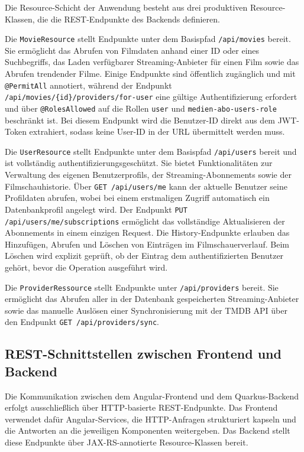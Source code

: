 Die Resource-Schicht der Anwendung besteht aus drei produktiven
Resource-Klassen, die die REST-Endpunkte des Backends definieren.

Die \texttt{MovieResource} stellt Endpunkte unter dem Basispfad
\texttt{/api/movies} bereit. Sie ermöglicht das Abrufen von Filmdaten anhand
einer ID oder eines Suchbegriffs, das Laden verfügbarer Streaming-Anbieter
für einen Film sowie das Abrufen trendender Filme. Einige Endpunkte sind
öffentlich zugänglich und mit \texttt{@PermitAll} annotiert, während der
Endpunkt \texttt{/api/movies/\{id\}/providers/for-user} eine gültige
Authentifizierung erfordert und über \texttt{@RolesAllowed} auf die Rollen
\texttt{user} und \texttt{medien-abo-users-role} beschränkt ist. Bei diesem
Endpunkt wird die Benutzer-ID direkt aus dem JWT-Token extrahiert, sodass
keine User-ID in der URL übermittelt werden muss.

Die \texttt{UserResource} stellt Endpunkte unter dem Basispfad
\texttt{/api/users} bereit und ist vollständig authentifizierungsgeschützt.
Sie bietet Funktionalitäten zur Verwaltung des eigenen Benutzerprofils, der
Streaming-Abonnements sowie der Filmschauhistorie. Über
\texttt{GET /api/users/me} kann der aktuelle Benutzer seine Profildaten
abrufen, wobei bei einem erstmaligen Zugriff automatisch ein Datenbankprofil
angelegt wird. Der Endpunkt \texttt{PUT /api/users/me/subscriptions} ermöglicht das vollständige Aktualisieren der Abonnements in einem einzigen
Request. Die History-Endpunkte erlauben das Hinzufügen, Abrufen und Löschen
von Einträgen im Filmschauerverlauf. Beim Löschen wird explizit geprüft, ob
der Eintrag dem authentifizierten Benutzer gehört, bevor die Operation
ausgeführt wird.

Die \texttt{ProviderRessource} stellt Endpunkte unter \texttt{/api/providers}
bereit. Sie ermöglicht das Abrufen aller in der Datenbank gespeicherten
Streaming-Anbieter sowie das manuelle Auslösen einer Synchronisierung mit
der TMDB API über den Endpunkt \texttt{GET /api/providers/sync}.

\subsection{REST-Schnittstellen zwischen Frontend und Backend}

Die Kommunikation zwischen dem Angular-Frontend und dem Quarkus-Backend
erfolgt ausschließlich über HTTP-basierte REST-Endpunkte. Das Frontend
verwendet dafür Angular-Services, die HTTP-Anfragen strukturiert kapseln
und die Antworten an die jeweiligen Komponenten weitergeben. Das Backend
stellt diese Endpunkte über JAX-RS-annotierte Resource-Klassen bereit.

